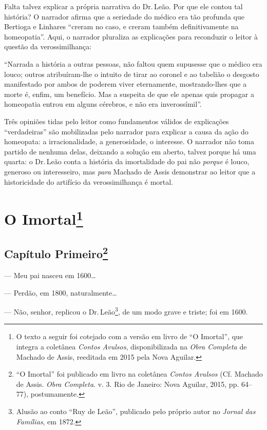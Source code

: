 Falta talvez explicar a própria narrativa do Dr.\,Leão. Por que ele
contou tal história? O narrador afirma que a seriedade do médico era tão
profunda que Bertioga e Linhares ``creram no caso, e creram também
definitivamente na homeopatia''. Aqui, o narrador pluraliza as
explicações para reconduzir o leitor à questão da verossimilhança:

``Narrada a história a outras pessoas, não faltou quem supusesse que o
médico era louco; outros atribuíram-lhe o intuito de tirar ao coronel e
ao tabelião o desgosto manifestado por ambos de poderem viver
eternamente, mostrando-lhes que a morte é, enfim, um benefício. Mas a
suspeita de que ele apenas quis propagar a homeopatia entrou em alguns
cérebros, e não era inverossímil''.

Três opiniões tidas pelo leitor como fundamentos válidos de explicações
``verdadeiras'' são mobilizadas pelo narrador para explicar a causa da
ação do homeopata: a irracionalidade, a generosidade, o interesse. O
narrador não toma partido de nenhuma delas, deixando a solução em
aberto, talvez porque há uma quarta: o Dr.\,Leão conta a história da
imortalidade do pai não \emph{porque} é louco, generoso ou interesseiro,
mas \emph{para} Machado de Assis demonstrar ao leitor que a
historicidade do artifício da verossimilhança é mortal.

\chapter{O Imortal\footnote[*]{O texto a seguir foi cotejado com a versão
  em livro de ``O Imortal'', que integra a coletânea \emph{Contos
  Avulsos}, disponibilizada na \emph{Obra Completa} de Machado de Assis,
  reeditada em 2015 pela Nova Aguilar.}}

\section{Capítulo Primeiro\protect\footnote{``O
  Imortal'' foi publicado em livro na coletânea \emph{Contos Avulsos}
  (Cf. Machado de Assis. \emph{Obra Completa}. v. 3. Rio de Janeiro:
  Nova Aguilar, 2015, pp. 64--77), postumamente.}}

--- Meu pai nasceu em 1600\ldots{}

--- Perdão, em 1800, naturalmente\ldots{}

--- Não, senhor, replicou o Dr.\,Leão\footnote{Alusão ao conto ``Ruy de
  Leão'', publicado pelo próprio autor no \emph{Jornal das Famílias}, em
  1872.}, de um modo grave e triste; foi em 1600.

